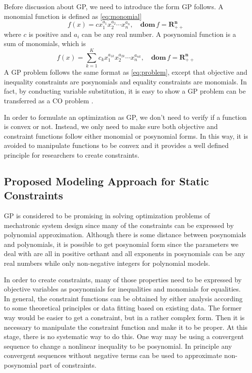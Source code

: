 Before discussion about GP, we need to introduce the form GP follows. A monomial function is defined as \ref{eq:monomial}
\begin{equation}
\label{eq:monomial}
f(x)=cx_1^{a_1}x_2^{a_2}\cdots x_n^{a_n}, \quad \mathbf{dom} \, f=\mathbf{R_{++}^n}
\end{equation}
where $c$ is positive and $a_i$ can be any real number. A posynomial function is a sum of monomials, which is 
\begin{equation}
\label{eq:posynomial}
f(x)=\sum_{k=1}^K c_kx_1^{a_{1k}}x_2^{a_{2k}}\cdots x_n^{a_{nk}}, \quad \mathbf{dom} \, f=\mathbf{R_{++}^n}
\end{equation}
A GP problem follows the same format as \ref{eq:problem}, except that objective and inequality constraints are posynomials and equality constraints are monomials. In fact, by conducting variable substitution, it is easy to show a GP problem can be transferred as a CO problem \cite{boyd2004convex}. 

In order to formulate an optimization as GP, we don't need to verify if a function is convex or not. Instead, we only need to make sure both objective and constraint functions follow either monomial or posynomial forms. In this way, it is avoided to manipulate functions to be convex and it provides a well defined principle for researchers to create constraints.

\subsection{Proposed Modeling Approach for Static Constraints}
GP is considered to be promising in solving optimization problems of mechatronic system design since many of the constraints can be expressed by polynomial approximation. Although there is some distance between posynomials and polynomials, it is possible to get posynomial form since the parameters we deal with are all in positive orthant and all exponents in posynomials can be any real numbers while only non-negative integers for polynomial models. 

In order to create constraints, many of those properties need to be expressed by objective variables as posynomials for inequalities and monomials for equalities. In general, the constraint functions can be obtained by either analysis according to some theoretical principles or data fitting based on existing data. The former way would be easier to get a constraint, but in a rather complex form. Then it is necessary to manipulate the constraint function and make it to be proper. At this stage, there is no systematic way to do this. One way may be using a convergent sequence to change a nonlinear inequality to be posynomial. In principle any convergent sequences without negative terms can be used to approximate non-posynomial part of constraints. 
 
